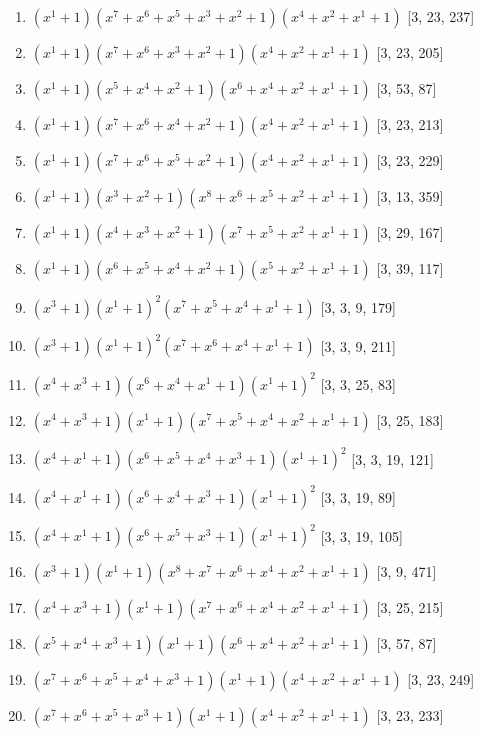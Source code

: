 \documentclass[10pt,twocolumn]{article}
\begin{document}
\begin{enumerate}
\item $(x^{1} + 1)(x^{7} + x^{6} + x^{5} + x^{3} + x^{2} + 1)(x^{4} + x^{2} + x^{1} + 1)$  [3, 23, 237]
\item $(x^{1} + 1)(x^{7} + x^{6} + x^{3} + x^{2} + 1)(x^{4} + x^{2} + x^{1} + 1)$  [3, 23, 205]
\item $(x^{1} + 1)(x^{5} + x^{4} + x^{2} + 1)(x^{6} + x^{4} + x^{2} + x^{1} + 1)$  [3, 53, 87]
\item $(x^{1} + 1)(x^{7} + x^{6} + x^{4} + x^{2} + 1)(x^{4} + x^{2} + x^{1} + 1)$  [3, 23, 213]
\item $(x^{1} + 1)(x^{7} + x^{6} + x^{5} + x^{2} + 1)(x^{4} + x^{2} + x^{1} + 1)$  [3, 23, 229]
\item $(x^{1} + 1)(x^{3} + x^{2} + 1)(x^{8} + x^{6} + x^{5} + x^{2} + x^{1} + 1)$  [3, 13, 359]
\item $(x^{1} + 1)(x^{4} + x^{3} + x^{2} + 1)(x^{7} + x^{5} + x^{2} + x^{1} + 1)$  [3, 29, 167]
\item $(x^{1} + 1)(x^{6} + x^{5} + x^{4} + x^{2} + 1)(x^{5} + x^{2} + x^{1} + 1)$  [3, 39, 117]
\item $(x^{3} + 1)(x^{1} + 1)^{2}(x^{7} + x^{5} + x^{4} + x^{1} + 1)$  [3, 3, 9, 179]
\item $(x^{3} + 1)(x^{1} + 1)^{2}(x^{7} + x^{6} + x^{4} + x^{1} + 1)$  [3, 3, 9, 211]
\item $(x^{4} + x^{3} + 1)(x^{6} + x^{4} + x^{1} + 1)(x^{1} + 1)^{2}$  [3, 3, 25, 83]
\item $(x^{4} + x^{3} + 1)(x^{1} + 1)(x^{7} + x^{5} + x^{4} + x^{2} + x^{1} + 1)$  [3, 25, 183]
\item $(x^{4} + x^{1} + 1)(x^{6} + x^{5} + x^{4} + x^{3} + 1)(x^{1} + 1)^{2}$  [3, 3, 19, 121]
\item $(x^{4} + x^{1} + 1)(x^{6} + x^{4} + x^{3} + 1)(x^{1} + 1)^{2}$  [3, 3, 19, 89]
\item $(x^{4} + x^{1} + 1)(x^{6} + x^{5} + x^{3} + 1)(x^{1} + 1)^{2}$  [3, 3, 19, 105]
\item $(x^{3} + 1)(x^{1} + 1)(x^{8} + x^{7} + x^{6} + x^{4} + x^{2} + x^{1} + 1)$  [3, 9, 471]
\item $(x^{4} + x^{3} + 1)(x^{1} + 1)(x^{7} + x^{6} + x^{4} + x^{2} + x^{1} + 1)$  [3, 25, 215]
\item $(x^{5} + x^{4} + x^{3} + 1)(x^{1} + 1)(x^{6} + x^{4} + x^{2} + x^{1} + 1)$  [3, 57, 87]
\item $(x^{7} + x^{6} + x^{5} + x^{4} + x^{3} + 1)(x^{1} + 1)(x^{4} + x^{2} + x^{1} + 1)$  [3, 23, 249]
\item $(x^{7} + x^{6} + x^{5} + x^{3} + 1)(x^{1} + 1)(x^{4} + x^{2} + x^{1} + 1)$  [3, 23, 233]

\end{enumerate}
\end{document}
